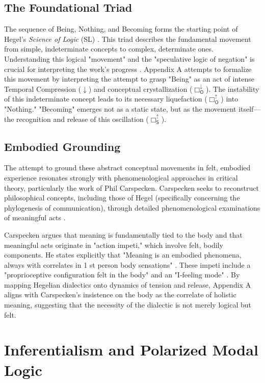 \documentclass[12pt]{article}
\newcommand{\SBoxUp}{\Box_{\mathsf{S}}^{\uparrow}}
\newcommand{\OBoxUp}{\Box_{\mathsf{O}}^{\uparrow}}
\newcommand{\OBoxDown}{\Box_{\mathsf{O}}^{\downarrow}}
\begin{document}
\subsection{The Foundational Triad}

The sequence of Being, Nothing, and Becoming forms the starting point of Hegel's \textit{Science of Logic} (SL) \parencite{inwood1992hegel, Hegel1830Logic}. This triad describes the fundamental movement from simple, indeterminate concepts to complex, determinate ones. Understanding this logical "movement" and the "speculative logic of negation" is crucial for interpreting the work's progress \parencite[p. 38]{Pippin:2019aa}. Appendix A attempts to formalize this movement by interpreting the attempt to grasp "Being" as an act of intense Temporal Compression ($\downarrow$) and conceptual crystallization ($\OBoxDown$). The instability of this indeterminate concept leads to its necessary liquefaction ($\OBoxUp$) into "Nothing." "Becoming" emerges not as a static state, but as the movement itself—the recognition and release of this oscillation ($\SBoxUp$).

\subsection{Embodied Grounding}

The attempt to ground these abstract conceptual movements in felt, embodied experience resonates strongly with phenomenological approaches in critical theory, particularly the work of Phil Carspecken. Carspecken seeks to reconstruct philosophical concepts, including those of Hegel (specifically concerning the phylogenesis of communication), through detailed phenomenological examinations of meaningful acts \parencite{Carspecken1999}.

Carspecken argues that meaning is fundamentally tied to the body and that meaningful acts originate in "action impeti," which involve felt, bodily components. He states explicitly that "Meaning is an embodied phenomena, always with correlates in 1 st person body sensations" \parencite[p. 20]{Carspecken1995aa}. These impeti include a "proprioceptive configuration felt in the body" and an "I-feeling mode" \parencite[p. 20]{Carspecken1995aa}. By mapping Hegelian dialectics onto dynamics of tension and release, Appendix A aligns with Carspecken's insistence on the body as the correlate of holistic meaning, suggesting that the necessity of the dialectic is not merely logical but felt.

\section{Inferentialism and Polarized Modal Logic}
\end{document}
